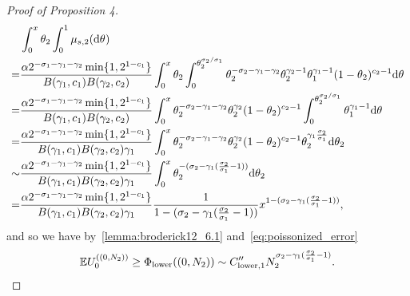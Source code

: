 \begin{proof}[Proof of Proposition 4]
\begin{align*}
    &\int_0^x \variantfreqperpop{2} \int_0^1 \mu_{s,2}(\de\vecvariantfreq{})\\
    =& \frac{\mass 2^{-\rate{1}-\corr{1}-\corr{2}}\min\{1, 2^{1-\conc{1}}\}}{B(\corr{1}, \conc{1})B(\corr{2}, \conc{2})}\int_0^x \variantfreqperpop{2} \int_0^{\variantfreqperpop{2}^{\rate{2}/\rate{1}}} \variantfreqperpop{2}^{-\rate{2}-\corr{1}-\corr{2}} \variantfreqperpop{2}^{\corr{2}-1}\variantfreqperpop{1}^{\corr{1}-1}(1-\variantfreqperpop{2})^{\conc{2}-1}\de\vecvariantfreq{}\\
    =& \frac{\mass 2^{-\rate{1}-\corr{1}-\corr{2}}\min\{1, 2^{1-\conc{1}}\}}{B(\corr{1}, \conc{1})B(\corr{2}, \conc{2})}\int_0^x \variantfreqperpop{2}^{-\rate{2}-\corr{1}-\corr{2}} \variantfreqperpop{2}^{\corr{2}} (1-\variantfreqperpop{2})^{\conc{2}-1} \int_0^{\variantfreqperpop{2}^{\rate{2}/\rate{1}}} \variantfreqperpop{1}^{\corr{1}-1}\de\vecvariantfreq{}\\
    =&\frac{\mass 2^{-\rate{1}-\corr{1}-\corr{2}}\min\{1, 2^{1-\conc{1}}\}}{B(\corr{1}, \conc{1})B(\corr{2}, \conc{2})\corr{1}}\int_0^x \variantfreqperpop{2}^{-\rate{2}-\corr{1}-\corr{2}} \variantfreqperpop{2}^{\corr{2}} (1-\variantfreqperpop{2})^{\conc{2}-1} \variantfreqperpop{2}^{\corr{1}\frac{\rate{2}}{\rate{1}}}\de\variantfreqperpop{2}\\
    \sim & \frac{\mass 2^{-\rate{1}-\corr{1}-\corr{2}}\min\{1, 2^{1-\conc{1}}\}}{B(\corr{1}, \conc{1})B(\corr{2}, \conc{2})\corr{1}}\int_0^x \variantfreqperpop{2}^{-(\rate{2}-\corr{1}(\frac{\rate{2}}{\rate{1}}-1))} \de\variantfreqperpop{2}\\
    =& \frac{\mass 2^{-\rate{1}-\corr{1}-\corr{2}}\min\{1, 2^{1-\conc{1}}\}}{B(\corr{1}, \conc{1})B(\corr{2}, \conc{2})\corr{1}} \frac{1}{1-(\rate{2}-\corr{1}(\frac{\rate{2}}{\rate{1}}-1))}x^{1-(\rate{2}-\corr{1}(\frac{\rate{2}}{\rate{1}}-1))},
\end{align*}
and so we have by~\cref{lemma:broderick12_6.1} and~\cref{eq:poissonized_error}
\begin{equation}
    \E \news{\zerovec}{(0, \samplesize{2})}\ge \lowerbound((0, \samplesize{2}))\sim \constantlowerwithrateprime{1} \samplesize{2}^{\rate{2}-\corr{1}(\frac{\rate{2}}{\rate{1}}-1)}.
    \label{eq:lowerbound_2g1_pop2_alt1} 
\end{equation}


\end{proof}
